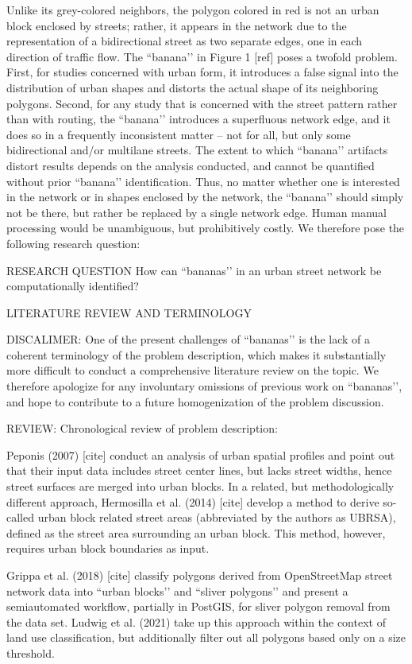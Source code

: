 Unlike its grey-colored neighbors, the polygon colored in red is not an urban block enclosed by streets; rather, it appears in the network due to the representation of a bidirectional street as two separate edges, one in each direction of traffic flow. The ``banana’’ in Figure 1 [ref] poses a twofold problem. First, for studies concerned with urban form, it introduces a false signal into the distribution of urban shapes and distorts the actual shape of its neighboring polygons. Second, for any study that is concerned with the street pattern rather than with routing, the ``banana’’ introduces a superfluous network edge, and it does so in a frequently inconsistent matter – not for all, but only some bidirectional and/or multilane streets. The extent to which ``banana’’ artifacts distort results depends on the analysis conducted, and cannot be quantified without prior ``banana’’ identification. Thus, no matter whether one is interested in the network or in shapes enclosed by the network, the ``banana’’ should simply not be there, but rather be replaced by a single network edge. Human manual processing would be unambiguous, but prohibitively costly. We therefore pose the following research question:

RESEARCH QUESTION
How can ``bananas’’ in an urban street network be computationally identified?

LITERATURE REVIEW AND TERMINOLOGY

DISCALIMER: One of the present challenges of ``bananas’’ is the lack of a coherent terminology of the problem description, which makes it substantially more difficult to conduct a comprehensive literature review on the topic. We therefore apologize for any involuntary omissions of previous work on ``bananas’’, and hope to contribute to a future homogenization of the problem discussion.


REVIEW: Chronological review of problem description:

Peponis (2007) [cite] conduct an analysis of urban spatial profiles and point out that their input data includes street center lines, but lacks street widths, hence street surfaces are merged into urban blocks. In a related, but methodologically different approach, Hermosilla et al. (2014) [cite] develop a method to derive so-called urban block related street areas (abbreviated by the authors as UBRSA), defined as the street area surrounding an urban block. This method, however, requires urban block boundaries as input.

Grippa et al. (2018) [cite] classify polygons derived from OpenStreetMap street network data into ``urban blocks’’ and ``sliver polygons’’ and present a semiautomated workflow, partially in PostGIS, for sliver polygon removal from the data set. Ludwig et al. (2021) take up this approach within the context of land use classification, but additionally filter out all polygons based only on a size threshold.


